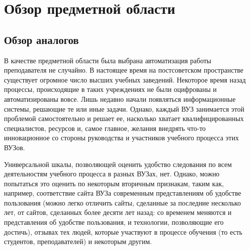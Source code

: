 \section{Обзор предметной области}
\label{sec:domain}

\subsection{Обзор аналогов}
\label{sec:domain:analogues}

В качестве предметной области была выбрана автоматизация работы преподавателя не случайно. В настоящее время на постсоветском пространстве существует огромное число высших учебных заведений. Некоторое время назад процессы, происходящие в таких учреждениях не были оцифрованы и автоматизированы вовсе. Лишь недавно начали появляться информационные системы, решающие те или иные задачи. Однако, каждый ВУЗ занимается этой проблемой самостоятельно и решает ее, насколько хватает квалифицированных специалистов, ресурсов и, самое главное, желания внедрять что-то инновационное со стороны руководства и участников учебного процесса этих ВУЗов. 

Универсальной шкалы, позволяющей оценить удобство следования по всем деятельностям учебного процесса в разных ВУЗах, нет. Однако, можно попытаться это оценить по некоторым вторичным признакам, таким как, например, соответствие сайта ВУЗа современным представлениям об удобстве пользования (можно легко отличить сайты, сделанные за последние несколько лет, от сайтов, сделанных более десяти лет назад: со временем меняются и представления об удобстве пользования, и технологии, позволяющие его достичь), отзывах тех людей, которые участвуют в процессе обучения (то есть студентов, преподавателей) и некоторым другим.

